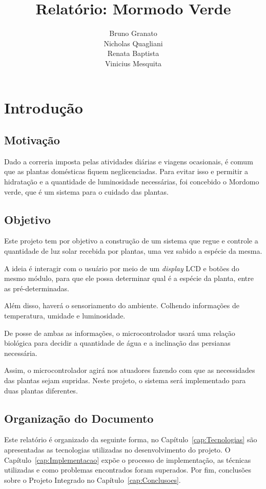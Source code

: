 \documentclass[a4paper,12pt]{report}
\title{ Relatório: Mormodo Verde }
\author{Bruno Granato \\
	Nicholas Quagliani\\
	Renata Baptista\\
	Vinicius Mesquita}
\begin{document}
\maketitle


\tableofcontents
\cleardoublepage
\chapter{Introdução}
	\section{Motivação}
		Dado a correria imposta pelas atividades diárias e viagens ocasionais, é comum que as plantas domésticas fiquem neglicenciadas. Para evitar isso e permitir a hidratação e a quantidade de luminosidade necessárias, foi concebido o Mordomo verde, que é um sistema para o cuidado das plantas.
	\section{Objetivo}
		Este projeto tem por objetivo a construção de um sistema que regue e controle a quantidade de luz solar recebida por plantas, uma vez sabido a espécie da mesma.
		
		A ideia é interagir com o usuário por meio de um \textit{display} LCD e botões do mesmo módulo, para que ele possa determinar qual é a espécie da planta, entre as pré-determinadas. 
		
		Além disso, haverá o sensoriamento do ambiente. Colhendo informações de temperatura, umidade e luminosidade.
		
		De posse de ambas as informações, o microcontrolador usará uma relação biológica para decidir a quantidade de água e a inclinação das persianas necessária. 
		
		Assim, o microcontrolador agirá nos atuadores fazendo com que as necessidades das plantas sejam supridas. Neste projeto, o sistema será implementado para duas plantas diferentes.
	\section{Organização do Documento}
	    Este relatório é organizado da seguinte forma, no Capítulo~\ref{cap:Tecnologias} são apresentadas as tecnologias utilizadas no desenvolvimento do projeto. O Capítulo~\ref{cap:Implementacao} expõe o processo de implementação, as técnicas utilizadas e como problemas encontrados foram superados. Por fim, conclusões sobre o Projeto Integrado no Capítulo~\ref{cap:Conclusoes}.
\end{document}
